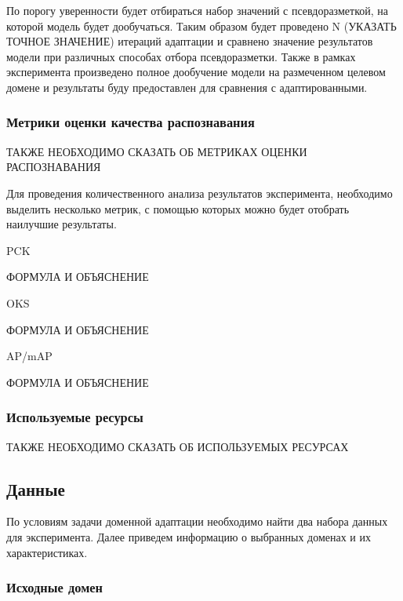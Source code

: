 По порогу уверенности будет отбираться набор значений с псевдоразметкой, на которой модель будет дообучаться. Таким образом будет проведено N (УКАЗАТЬ ТОЧНОЕ ЗНАЧЕНИЕ) итераций адаптации и сравнено значение результатов модели при различных способах отбора псевдоразметки. Также в рамках эксперимента произведено полное дообучение модели на размеченном целевом домене и результаты буду предоставлен для сравнения с адаптированными.

\subsubsection*{Метрики оценки качества распознавания}

ТАКЖЕ НЕОБХОДИМО СКАЗАТЬ ОБ МЕТРИКАХ ОЦЕНКИ РАСПОЗНАВАНИЯ

Для проведения количественного анализа результатов эксперимента, необходимо выделить несколько метрик, с помощью которых можно будет отобрать наилучшие результаты.

PCK

ФОРМУЛА И ОБЪЯСНЕНИЕ

OKS

ФОРМУЛА И ОБЪЯСНЕНИЕ

AP/mAP

ФОРМУЛА И ОБЪЯСНЕНИЕ

\subsubsection*{Используемые ресурсы}

ТАКЖЕ НЕОБХОДИМО СКАЗАТЬ ОБ ИСПОЛЬЗУЕМЫХ РЕСУРСАХ

\subsection{Данные}

По условиям задачи доменной адаптации необходимо найти два набора данных для эксперимента. Далее приведем информацию о выбранных доменах и их характеристиках.

\subsubsection*{Исходные домен}


